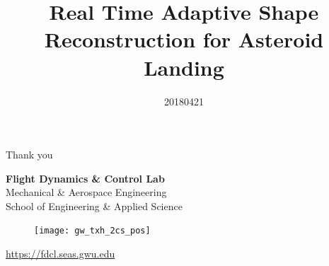 \documentclass[11pt,professionalfonts,aspectratio=169]{beamer}
\title[Asteroid Reconstruction]{\large\textbf Real Time Adaptive Shape Reconstruction for Asteroid Landing}
\author{\vspace*{-0.3cm}}
\institute{
	\footnotesize
	{\normalsize\bf{Shankar Kulumani}}\\
	\vspace*{0.2cm}
  	\textbf{Department of Mechanical \& Aerospace Engineering}\\ \vspace*{0.5cm}
 	\begin{figure} %
       	\texttt{[image: gw\_txh\_2cs\_pos]}
  	\end{figure}
}
\date{20180421}
\begin{document}

\setcounter{framenumber}{-1}
\begin{frame} %
  \titlepage
\end{frame}   %

\begin{frame}[c]{Thank you}
  \centering
  
  \textbf{\large Flight Dynamics \& Control Lab} \\
  Mechanical \& Aerospace Engineering \\
  School of Engineering \& Applied Science
  
  \begin{figure} %
        \texttt{[image: gw\_txh\_2cs\_pos]}
    \end{figure}
  
  \url{https://fdcl.seas.gwu.edu}
\end{frame}
\end{document}
